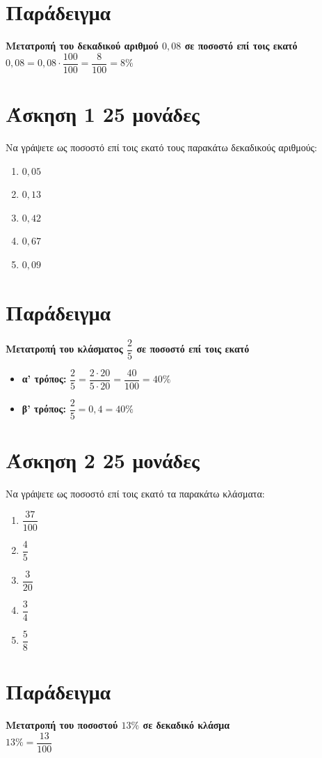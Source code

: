 \documentclass[a4paper,10pt]{report}
\begin{document}
\section*{Παράδειγμα \hfill \small{}}
\textbf{Μετατροπή του δεκαδικού αριθμού $0,08$ σε ποσοστό επί τοις εκατό }\\
$0,08 = 0,08\cdot \dfrac{100}{100} = \dfrac{8}{100} =8\%$




\section*{Άσκηση 1  \hfill \small{25 μονάδες}}
Να γράψετε ως ποσοστό επί τοις εκατό τους παρακάτω δεκαδικούς αριθμούς:
\begin{enumerate}[1)]
 \item $0,05$
 \item $0,13$
 \item $0,42$
 \item $0,67$
 \item $0,09$
\end{enumerate}


\section*{Παράδειγμα \hfill \small{}}
\textbf{Μετατροπή του κλάσματος $\dfrac{2}{5}$ σε ποσοστό επί τοις εκατό }
\begin{itemize}
 \item \textbf{α' τρόπος:} $\dfrac{2}{5}=\dfrac{2\cdot 20}{5\cdot 20}=\dfrac{40}{100}=40\%$
 \item \textbf{β' τρόπος:} $\dfrac{2}{5}=0,4=40\%$
\end{itemize}



\section*{Άσκηση 2  \hfill \small{25 μονάδες}}
Να γράψετε ως ποσοστό επί τοις εκατό τα παρακάτω κλάσματα:
\begin{enumerate}[1)]
 \item $\dfrac{37}{100}$
 \item $\dfrac{4}{5}$
 \item $\dfrac{3}{20}$
 \item $\dfrac{3}{4}$
 \item $\dfrac{5}{8}$
\end{enumerate}


\section*{Παράδειγμα \hfill \small{}}
\textbf{Μετατροπή του  ποσοστού $13\%$ σε δεκαδικό κλάσμα }\\
$13\% =\dfrac{13}{100}$
\end{document}
